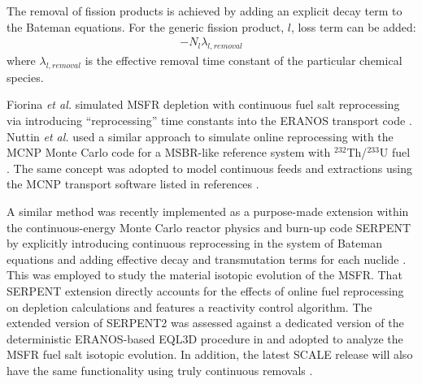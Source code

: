 The removal of fission products is achieved by adding an explicit decay 
term to the Bateman equations. For the generic fission product, $l$, 
loss term can be added:
\begin{align} 
- N_{l}\lambda_{l,removal}  \label{eq:rem_term}
\end{align}
where $\lambda_{l,removal}$ is the effective removal time constant of the particular chemical species. 

Fiorina \emph{et al.} simulated \gls{MSFR} depletion with continuous fuel 
salt reprocessing via introducing 
``reprocessing'' time constants into the ERANOS transport code 
\cite{fiorina_preliminary_2012-1}. Nuttin \emph{et al.} used a similar approach 
to simulate online reprocessing with the MCNP Monte Carlo code for a 
\gls{MSBR}-like reference 
system with $^{232}$Th/$^{233}$U fuel \cite{nuttin_potential_2005}.
The same concept was adopted to model continuous feeds and extractions 
using the 
MCNP transport software listed in references \cite{doligez_coupled_2014,
heuer_towards_2014}. 

A similar method was recently implemented as a purpose-made extension within 
the continuous-energy Monte Carlo reactor physics and burn-up code 
SERPENT by explicitly introducing 
continuous reprocessing in the system of Bateman equations and adding 
effective decay and transmutation terms for each nuclide 
\cite{aufiero_extended_2013}. This was employed to study the material 
isotopic evolution of the \gls{MSFR}\cite{aufiero_extended_2013}. 
That SERPENT extension \cite{aufiero_extended_2013} directly 
accounts for the effects of online fuel reprocessing on depletion calculations 
and features a reactivity control 
algorithm. The extended version of SERPENT2 was assessed against a dedicated 
version of the deterministic ERANOS-based EQL3D procedure in
\cite{ruggieri_eranos_2006, fiorina_investigation_2013} and adopted to analyze 
the \gls{MSFR} fuel salt isotopic evolution. In addition, the latest SCALE release 
will also have the same functionality using truly continuous removals \cite{betzler_implementation_2017}. 

